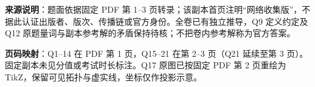 

\begin{gktip}
\textbf{来源说明}：题面依据固定 PDF 第 1–3 页转录；该副本首页注明“网络收集版”，不据此认证出版者、版次、传播链或官方身份。全卷已有独立推导，Q9 定义约定及 Q12 原题量词与副本参考解的矛盾保持待核；不把卷内参考解称为官方答案。

\textbf{页码映射}：Q1–14 在 PDF 第 1 页，Q15–21 在第 2–3 页（Q21 延续至第 3 页）。固定副本未见分值或考试时长标注。Q17 原图已按固定 PDF 第 2 页重绘为 TikZ，保留可见拓扑与虚实线，坐标仅作投影示意。
\end{gktip}


